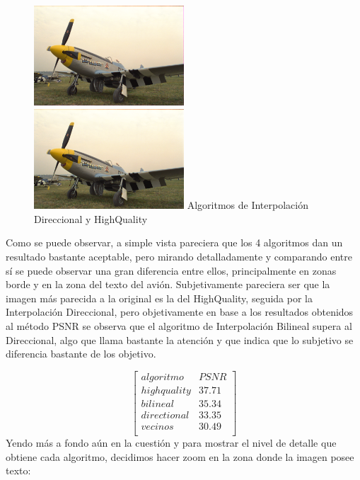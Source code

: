 {\begin{figure}[h]
       \includegraphics[width=0.5\textwidth]{imagenes/img9_demosicing_spline.png}
           \hfill
        \includegraphics[width=0.5\textwidth]{imagenes/img9_demosicing_quality.png}
        Algoritmos de Interpolación Direccional y HighQuality
\end{figure}
\newpage

Como se puede observar, a simple vista pareciera que los 4 algoritmos dan un resultado bastante aceptable, pero mirando detalladamente y comparando entre sí se puede observar una gran diferencia entre ellos, principalmente en zonas borde y en la zona del texto del avión. Subjetivamente pareciera ser que la imagen más parecida a la original es la del HighQuality, seguida por la Interpolación Direccional, pero objetivamente en base a los resultados obtenidos al método PSNR se observa que el algoritmo de Interpolación Bilineal supera al Direccional, algo que llama bastante la atención y que indica que lo subjetivo se diferencia bastante de los objetivo. 

$$ 
\begin{bmatrix}
        algoritmo   &      PSNR     \\
       highquality    &   37.71  \\
       bilineal    &     35.34  \\
       directional    &      33.35    \\
       vecinos   &      30.49     \\
\end{bmatrix} 
$$
Yendo más a fondo aún en la cuestión y para mostrar el nivel de detalle que obtiene cada algoritmo, decidimos hacer zoom en la zona donde la imagen posee texto:

}

